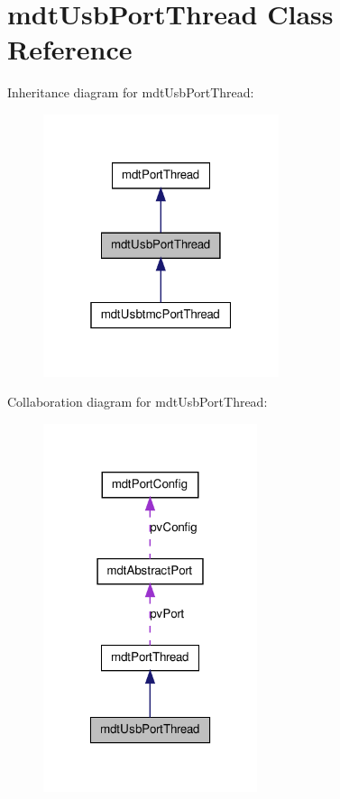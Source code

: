 \hypertarget{classmdt_usb_port_thread}{
\section{mdtUsbPortThread Class Reference}
\label{classmdt_usb_port_thread}
}


Inheritance diagram for mdtUsbPortThread:\nopagebreak
\begin{figure}[H]
\begin{center}
\leavevmode
\includegraphics[width=196pt]{classmdt_usb_port_thread__inherit__graph}
\end{center}
\end{figure}


Collaboration diagram for mdtUsbPortThread:\nopagebreak
\begin{figure}[H]
\begin{center}
\leavevmode
\includegraphics[width=178pt]{classmdt_usb_port_thread__coll__graph}
\end{center}
\end{figure}
